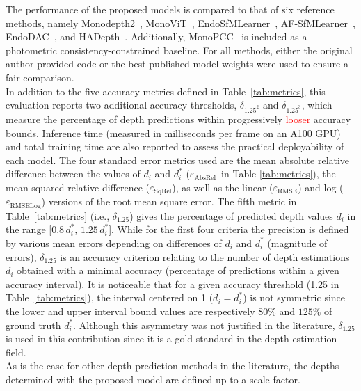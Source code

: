 \documentclass[a4paper,fleqn]{cas-dc}
\begin{document}
 The performance of the proposed models is compared to that of six reference methods, namely Monodepth2~\citep{Godard_ICCV_2019}, MonoViT~\citep{Zhao_3DV_2022}, 
EndoSfMLearner~\citep{Ozyoruk_MIA_2021}, AF-SfMLearner~\citep{Shao_MIA_2022}, EndoDAC~\citep{EndoDAC_MICCAI_2024}, and HADepth~\citep{HAdepth_2025}. Additionally, MonoPCC~\citep{wang2025monopcc}  is included as a photometric consistency-constrained baseline. For all methods, either the original author-provided code or the best published model weights were used to ensure a fair comparison. \\
%
In addition to the five accuracy metrics defined in Table~\ref{tab:metrics}, this evaluation reports 
two additional accuracy thresholds, $\delta_{1.25^2}$ and $\delta_{1.25^3}$, which measure the percentage 
of depth predictions within progressively \textcolor{red}{looser} accuracy bounds. Inference time (measured in milliseconds per frame on an A100 GPU) and total training time are also reported to assess the practical deployability of each model.
%
The four standard error metrics used are the mean absolute relative difference between the values of $d_i$ and $d_i^*$ ($\varepsilon_\textrm{AbsRel}$~in Table \ref{tab:metrics}), the mean squared relative difference ($\varepsilon_\textrm{SqRel}$), as well as the linear ($\varepsilon_\textrm{RMSE}$) and log ($\varepsilon_\textrm{RMSELog}$) versions  of the root mean square error. 
%
The fifth metric in Table~\ref{tab:metrics} (i.e., $\delta_{1.25}$)  gives the percentage of predicted depth values $d_i$  in the range  [$0.8\,d_i^*$, $1.25\,d_i^*$]. While for the first four criteria the precision is defined by various mean errors depending on differences of $d_i$ and $d_i^*$ (magnitude of errors), $\delta_{1.25}$ is an accuracy criterion relating to the number of depth estimations $d_i$ obtained with a minimal accuracy (percentage of predictions within a given accuracy interval). It is noticeable that for a given accuracy threshold (1.25 in Table~\ref{tab:metrics}), the interval centered on 1 ($d_i = d_i^*$) is not symmetric since the lower and upper interval bound values are respectively $80\%$ and $125\%$ of ground truth $d_i^*$. Although this asymmetry was not justified in the literature, $\delta_{1.25}$ is used in this contribution since it is a gold standard in the depth estimation field. \vspace*{1mm} \\ 
%
As is the case for other depth prediction methods in the literature, the depths determined with the proposed model are defined up to a scale factor. 
\end{document}
